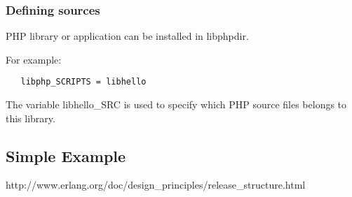 \subsubsection{Defining sources}

PHP library or application can be installed in libphpdir.

For example:
\begin{verbatim}
   libphp_SCRIPTS = libhello
\end{verbatim}

The variable libhello\_SRC is used to specify which PHP source files belongs to this library.



\subsection{Simple Example}

\begin{thebibliography}{}
http://www.erlang.org/doc/design\_principles/release\_structure.html
\end{thebibliography}


